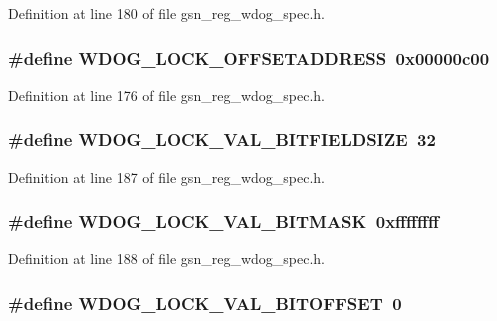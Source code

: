 Definition at line 180 of file gsn\_\-reg\_\-wdog\_\-spec.h.

\hypertarget{a00577_addf24c6cd3010e36cc2f6e07fbdf6c37}{
\subsubsection[{WDOG\_\-LOCK\_\-OFFSETADDRESS}]{\setlength{\rightskip}{0pt plus 5cm}\#define WDOG\_\-LOCK\_\-OFFSETADDRESS~0x00000c00}}
\label{a00577_addf24c6cd3010e36cc2f6e07fbdf6c37}


Definition at line 176 of file gsn\_\-reg\_\-wdog\_\-spec.h.

\hypertarget{a00577_aa3e8d10479518ca42fe764b29568f061}{
\subsubsection[{WDOG\_\-LOCK\_\-VAL\_\-BITFIELDSIZE}]{\setlength{\rightskip}{0pt plus 5cm}\#define WDOG\_\-LOCK\_\-VAL\_\-BITFIELDSIZE~32}}
\label{a00577_aa3e8d10479518ca42fe764b29568f061}


Definition at line 187 of file gsn\_\-reg\_\-wdog\_\-spec.h.

\hypertarget{a00577_a57c0d0795acbc95a67b4fd9b7d4459a9}{
\subsubsection[{WDOG\_\-LOCK\_\-VAL\_\-BITMASK}]{\setlength{\rightskip}{0pt plus 5cm}\#define WDOG\_\-LOCK\_\-VAL\_\-BITMASK~0xffffffff}}
\label{a00577_a57c0d0795acbc95a67b4fd9b7d4459a9}


Definition at line 188 of file gsn\_\-reg\_\-wdog\_\-spec.h.

\hypertarget{a00577_ad5de32ea7afa75535ee3f1a162765b1d}{
\subsubsection[{WDOG\_\-LOCK\_\-VAL\_\-BITOFFSET}]{\setlength{\rightskip}{0pt plus 5cm}\#define WDOG\_\-LOCK\_\-VAL\_\-BITOFFSET~0}}
\label{a00577_ad5de32ea7afa75535ee3f1a162765b1d}


